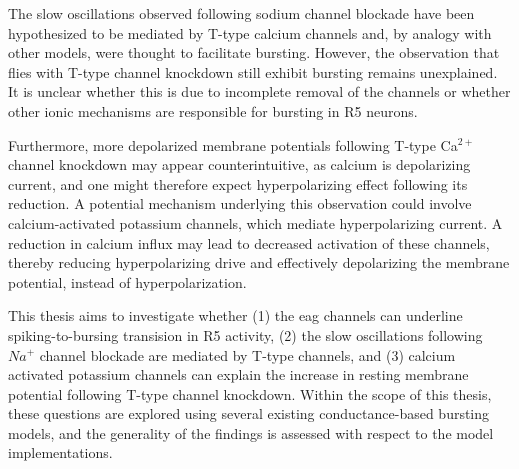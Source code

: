 \documentclass[../main.tex]{subfiles}
\begin{document}
The slow oscillations observed following sodium channel blockade have been hypothesized to be mediated by T-type calcium channels and, by analogy with other models, were thought to facilitate bursting. However, the observation that flies with T-type channel knockdown still exhibit bursting remains unexplained. It is unclear whether this is due to incomplete removal of the channels or whether other ionic mechanisms are responsible for bursting in R5 neurons.

Furthermore, more depolarized membrane potentials following T-type Ca$^{2+}$ channel knockdown may appear counterintuitive, as calcium is depolarizing current, and one might therefore expect hyperpolarizing effect following its reduction. A potential mechanism underlying this observation could involve calcium-activated potassium channels, which mediate hyperpolarizing current. A reduction in calcium influx may lead to decreased activation of these channels, thereby reducing hyperpolarizing drive and effectively depolarizing the membrane potential, instead of hyperpolarization.

This thesis aims to investigate whether (1) the \gls{eag} channels can underline spiking-to-bursing transision in R5 activity, (2) the slow oscillations following $Na^+$ channel blockade are mediated by T-type channels, and (3) calcium activated potassium channels can explain the increase in resting membrane potential following T-type channel knockdown. Within the scope of this thesis, these questions are explored using several existing conductance-based bursting models, and the generality of the findings is assessed with respect to the model implementations.



\end{document}
